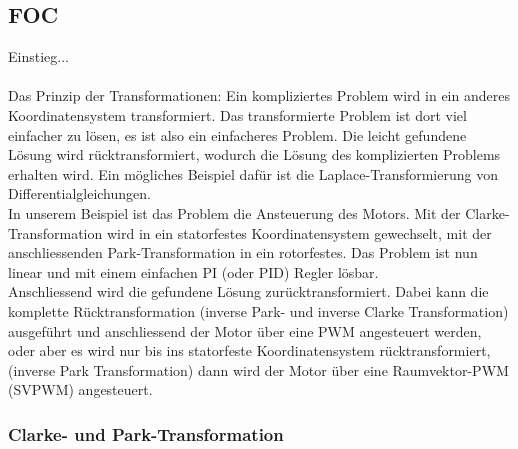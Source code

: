 \subsection{FOC}
\label{tGl_FOC}
Einstieg...\\
\\
Das Prinzip der Transformationen:
Ein kompliziertes Problem wird in ein anderes Koordinatensystem transformiert. Das transformierte Problem ist dort viel einfacher zu lösen, es ist also ein einfacheres Problem. Die leicht gefundene Lösung wird rücktransformiert, wodurch die Lösung des komplizierten Problems erhalten wird. Ein mögliches Beispiel dafür ist die Laplace-Transformierung von Differentialgleichungen. 
\\
In unserem Beispiel ist das Problem die Ansteuerung des Motors. Mit der Clarke-Transformation wird in ein statorfestes Koordinatensystem gewechselt, mit der anschliessenden Park-Transformation in ein rotorfestes. Das Problem ist nun linear und mit einem einfachen PI (oder PID) Regler lösbar. \\
Anschliessend wird die gefundene Lösung zurücktransformiert. Dabei kann die komplette Rücktransformation (inverse Park- und inverse Clarke Transformation) ausgeführt und anschliessend der Motor über eine PWM angesteuert werden, oder aber es wird nur bis ins statorfeste Koordinatensystem rücktransformiert, (inverse Park Transformation) dann wird der Motor über eine Raumvektor-PWM (SVPWM) angesteuert.


\subsubsection*{Clarke- und Park-Transformation}

